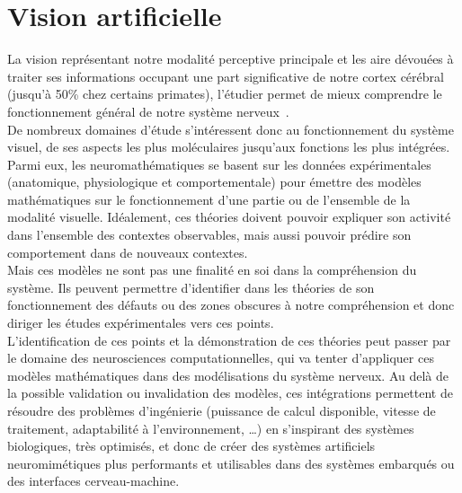 \section{Vision artificielle}
La vision représentant notre modalité perceptive principale et les aire dévouées à traiter ses informations occupant une part significative de notre cortex cérébral (jusqu'à 50\% chez certains primates), l'étudier permet de mieux comprendre le fonctionnement général de notre système nerveux~\autocite{Zhaoping2014}.\\
De nombreux domaines d'étude s'intéressent donc au fonctionnement du système visuel, de ses aspects les plus moléculaires jusqu'aux fonctions les plus intégrées. Parmi eux, les neuromathématiques se basent sur les données expérimentales (anatomique, physiologique et comportementale) pour émettre des modèles mathématiques sur le fonctionnement d'une partie ou de l'ensemble de la modalité visuelle. Idéalement, ces théories doivent pouvoir expliquer son activité dans l'ensemble des contextes observables, mais aussi pouvoir prédire son comportement dans de nouveaux contextes\autocite{Zhaoping2014}.\\
Mais ces modèles ne sont pas une finalité en soi dans la compréhension du système. Ils peuvent permettre d'identifier dans les théories de son fonctionnement des défauts ou des zones obscures à notre compréhension et donc diriger les études expérimentales vers ces points\autocite{Zhaoping2014}.\\
L'identification de ces points et la démonstration de ces théories peut passer par le domaine des neurosciences computationnelles, qui va tenter d'appliquer ces modèles mathématiques dans des modélisations du système nerveux. Au delà de la possible validation ou invalidation des modèles, ces intégrations permettent de résoudre des problèmes d'ingénierie (puissance de calcul disponible, vitesse de traitement, adaptabilité à l'environnement, \ldots) en s'inspirant des systèmes biologiques, très optimisés, et donc de créer des systèmes artificiels neuromimétiques plus performants et utilisables dans des systèmes embarqués ou des interfaces cerveau-machine.\\

